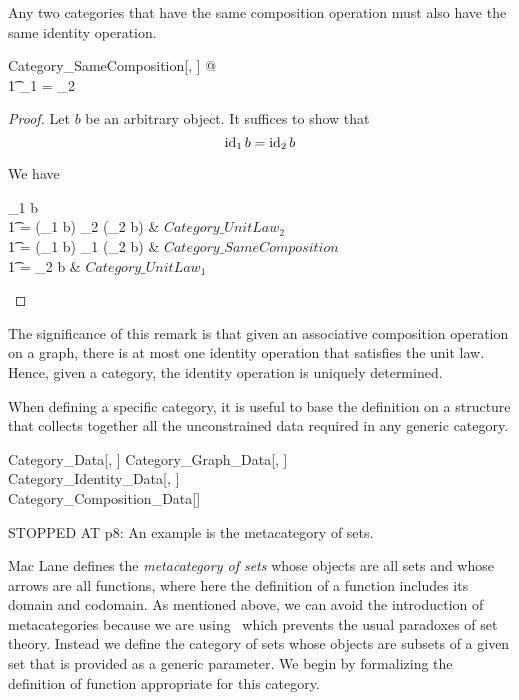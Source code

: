 \documentclass{amsart}
\begin{document}
\begin{remark}
Any two categories that have the same composition operation must also have the same identity operation.
\begin{zed}
	\forall Category\_SameComposition[\setO, \setA] @ \\
	\t1	\idCat_1 = \idCat_2
\end{zed}

\begin{proof}
Let $b$ be an arbitrary object. It suffices to show that
\[
	\operatorname{id}_1 b = \operatorname{id}_2 b
\]

We have
\begin{argue}
	\idCat_1 b \\
	\t1	= (\idCat_1 b) \compCat_2 (\idCat_2 b)	& $Category\_UnitLaw_2$ \\
	\t1	= (\idCat_1 b) \compCat_1 (\idCat_2 b)	& $Category\_SameComposition$ \\
	\t1	= \idCat_2 b						& $Category\_UnitLaw_1$
\end{argue}

\end{proof}
\end{remark}

The significance of this remark is that given an associative composition operation on a graph, there is at most one identity operation that
satisfies the unit law. Hence, given a category, the identity operation is uniquely determined.

When defining a specific category, it is useful to base the definition on a structure that collects together all the 
unconstrained data required in any generic category.
\begin{schema}{Category\_Data}[\genO, \genA]
	Category\_Graph\_Data[\genO, \genA] \\
	Category\_Identity\_Data[\genO, \genA] \\
	Category\_Composition\_Data[\genA]
\end{schema}

STOPPED AT p8: An example is the metacategory of sets.

Mac Lane \cite[p8]{maclane-cftwm} defines the \textit{metacategory of sets} whose objects are all sets and whose
arrows are all functions, where here the definition of a function includes its domain and codomain.
As mentioned above, we can avoid the introduction of metacategories because we are using \ZN\ which prevents the usual
paradoxes of set theory.
Instead we define the category of sets whose objects are subsets of a given set that is provided as a generic parameter.
We begin by formalizing the definition of function appropriate for this category.
\end{document}
